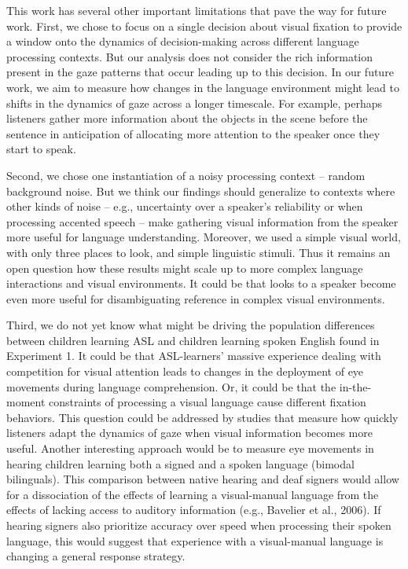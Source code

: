 \documentclass[english,floatsintext,man]{apa6}
\begin{document}
This work has several other important limitations that pave the way for
future work. First, we chose to focus on a single decision about visual
fixation to provide a window onto the dynamics of decision-making across
different language processing contexts. But our analysis does not
consider the rich information present in the gaze patterns that occur
leading up to this decision. In our future work, we aim to measure how
changes in the language environment might lead to shifts in the dynamics
of gaze across a longer timescale. For example, perhaps listeners gather
more information about the objects in the scene before the sentence in
anticipation of allocating more attention to the speaker once they start
to speak.

Second, we chose one instantiation of a noisy processing context --
random background noise. But we think our findings should generalize to
contexts where other kinds of noise -- e.g., uncertainty over a
speaker's reliability or when processing accented speech -- make
gathering visual information from the speaker more useful for language
understanding. Moreover, we used a simple visual world, with only three
places to look, and simple linguistic stimuli. Thus it remains an open
question how these results might scale up to more complex language
interactions and visual environments. It could be that looks to a
speaker become even more useful for disambiguating reference in complex
visual environments.

Third, we do not yet know what might be driving the population
differences between children learning ASL and children learning spoken
English found in Experiment 1. It could be that ASL-learners' massive
experience dealing with competition for visual attention leads to
changes in the deployment of eye movements during language
comprehension. Or, it could be that the in-the-moment constraints of
processing a visual language cause different fixation behaviors. This
question could be addressed by studies that measure how quickly
listeners adapt the dynamics of gaze when visual information becomes
more useful. Another interesting approach would be to measure eye
movements in hearing children learning both a signed and a spoken
language (bimodal bilinguals). This comparison between native hearing
and deaf signers would allow for a dissociation of the effects of
learning a visual-manual language from the effects of lacking access to
auditory information (e.g., Bavelier et al., 2006). If hearing signers
also prioritize accuracy over speed when processing their spoken
language, this would suggest that experience with a visual-manual
language is changing a general response strategy.
\end{document}
